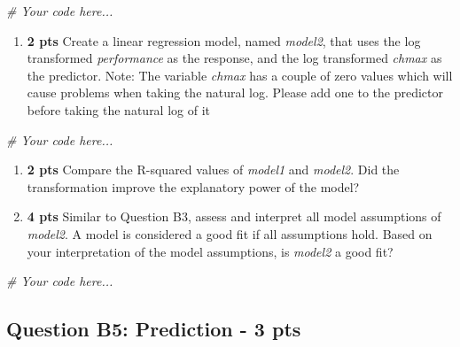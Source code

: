 \documentclass[
]{article}
\newenvironment{Shaded}{\begin{snugshade}}{\end{snugshade}}
\newcommand{\CommentTok}[1]{\textcolor[rgb]{0.56,0.35,0.01}{\textit{#1}}}
\providecommand{\tightlist}{%
  \setlength{\itemsep}{0pt}\setlength{\parskip}{0pt}}
\begin{document}
\begin{Shaded}
\begin{Highlighting}[]
\CommentTok{\# Your code here...}
\end{Highlighting}
\end{Shaded}

\begin{enumerate}
\def\labelenumi{\alph{enumi}.}
\setcounter{enumi}{1}
\tightlist
\item
  \textbf{2 pts} Create a linear regression model, named \emph{model2},
  that uses the log transformed \emph{performance} as the response, and
  the log transformed \emph{chmax} as the predictor. Note: The variable
  \emph{chmax} has a couple of zero values which will cause problems
  when taking the natural log. Please add one to the predictor before
  taking the natural log of it
\end{enumerate}

\begin{Shaded}
\begin{Highlighting}[]
\CommentTok{\# Your code here...}
\end{Highlighting}
\end{Shaded}

\begin{enumerate}
\def\labelenumi{\alph{enumi}.}
\setcounter{enumi}{2}
\item
  \textbf{2 pts} Compare the R-squared values of \emph{model1} and
  \emph{model2}. Did the transformation improve the explanatory power of
  the model?
\item
  \textbf{4 pts} Similar to Question B3, assess and interpret all model
  assumptions of \emph{model2}. A model is considered a good fit if all
  assumptions hold. Based on your interpretation of the model
  assumptions, is \emph{model2} a good fit?
\end{enumerate}

\begin{Shaded}
\begin{Highlighting}[]
\CommentTok{\# Your code here...}
\end{Highlighting}
\end{Shaded}

\hypertarget{question-b5-prediction---3-pts}{%
\subsection{Question B5: Prediction - 3
pts}\label{question-b5-prediction---3-pts}}
\end{document}
